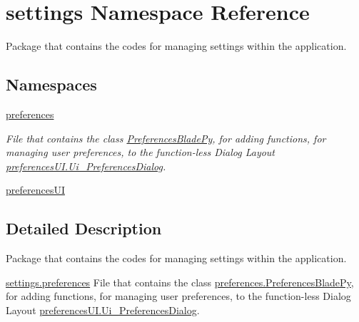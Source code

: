 \hypertarget{a00058}{}\section{settings Namespace Reference}
\label{a00058}


Package that contains the codes for managing settings within the application.  


\subsection*{Namespaces}
\begin{DoxyCompactItemize}
\item 
 \hyperlink{a00059}{preferences}
\begin{DoxyCompactList}\small\item\em File that contains the class \hyperlink{a00102}{Preferences\+Blade\+Py}, for adding functions, for managing user preferences, to the function-\/less Dialog Layout \hyperlink{a00106}{preferences\+U\+I.\+Ui\+\_\+\+Preferences\+Dialog}. \end{DoxyCompactList}\item 
 \hyperlink{a00060}{preferences\+UI}
\end{DoxyCompactItemize}


\subsection{Detailed Description}
Package that contains the codes for managing settings within the application. 

\begin{DoxyItemize}
\item {\ttfamily \hyperlink{a00059}{settings.\+preferences}} File that contains the class \hyperlink{a00102}{preferences.\+Preferences\+Blade\+Py}, for adding functions, for managing user preferences, to the function-\/less Dialog Layout \hyperlink{a00106}{preferences\+U\+I.\+Ui\+\_\+\+Preferences\+Dialog}. \end{DoxyItemize}
